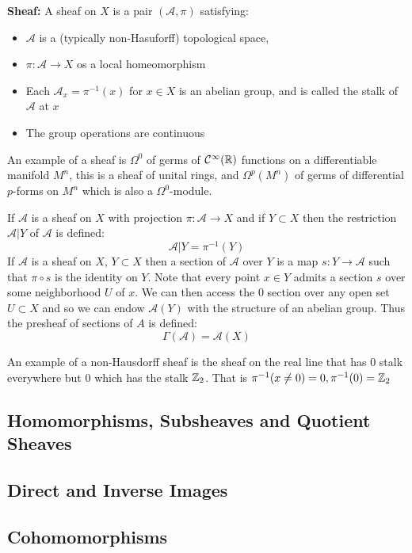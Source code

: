 \begin{definition}
    \textbf{Sheaf: }A sheaf on $X$ is a pair $(\mathcal{A}, \pi)$ satisfying:
    \begin{itemize}
        \item $\mathcal{A}$ is a (typically non-Hasuforff) topological space,
        \item $\pi: \mathcal{A}\to X$ os a local homeomorphism
        \item Each $\mathcal{A}_x = \pi^{-1}(x)$ for $x\in X$ is an abelian group, and is called the stalk of $\mathcal{A}$ at $x$
        \item The group operations are continuous
    \end{itemize}
\end{definition}
An example of a sheaf is $\Omega^0$ of germs of $\mathcal{C}^\infty(\mathbb{R})$ functions on a differentiable manifold $M^n$, this is a sheaf of unital rings, and $\Omega^p(M^n)$ of germs of differential $p$-forms on $M^n$ which is also a $\Omega^0$-module.

If $\mathcal{A}$ is a sheaf on $X$ with projection $\pi: \mathcal{A}\to X$ and if $Y\subset X$ then the restriction $\mathcal{A}|Y$ of $\mathcal{A}$ is defined:
\[\mathcal{A}|Y = \pi^{-1}(Y)\]
If $\mathcal{A}$ is a sheaf on $X$, $Y \subset X$ then a section of $\mathcal{A}$ over $Y$ is a map $s: Y\to\mathcal{A}$ such that $\pi \circ s$ is the identity on $Y$. Note that every point $x\in Y$ admits a section $s$ over some neighborhood $U$ of $x$. We can then access the $0$ section over any open set $U \subset X$ and so we can endow $\mathcal{A}(Y)$ with the structure of an abelian group. Thus the presheaf of sections of $A$ is defined:
\[\Gamma(\mathcal{A}) = \mathcal{A}(X)\]

An example of a non-Hausdorff sheaf is the sheaf on the real line that has $0$ stalk everywhere but $0$ which has the stalk $\mathbb{Z}_2$. That is $\pi^{-1}(x \neq 0) = 0, \pi^{-1}(0) = \mathbb{Z}_2$ 

\subsection{Homomorphisms, Subsheaves and Quotient Sheaves}
\subsection{Direct and Inverse Images}
\subsection{Cohomomorphisms}
